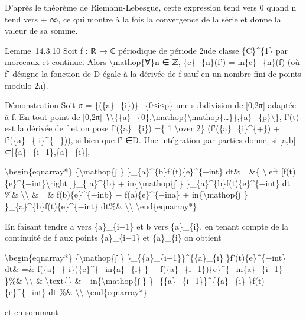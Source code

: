 \documentclass[]{article}
\begin{document}
D'après le théorème de Riemann-Lebesgue, cette expression tend vers 0
quand n tend vers + ∞, ce qui montre à la fois la convergence de la
série et donne la valeur de sa somme.

Lemme~14.3.10 Soit f : ℝ → ℂ périodique de période 2πde classe
\{C\}\^{}\{1\} par morceaux et continue. Alors
\textbackslash{}mathop\{∀\}n ∈ ℤ, \{c\}\_\{n\}(f') = in\{c\}\_\{n\}(f)
(où f' désigne la fonction de D égale à la dérivée de f sauf en un
nombre fini de points modulo 2π).

Démonstration Soit σ = \{(\{a\}\_\{i\})\}\_\{0≤i≤p\} une subdivision de
{[}0,2π{]} adaptée à f. En tout point de {[}0,2π{]}
∖\textbackslash{}\{\{a\}\_\{0\},\textbackslash{}mathop\{\textbackslash{}mathop\{\ldots{}\}\},\{a\}\_\{p\}\textbackslash{}\},
f'(t) est la dérivée de f et on pose f'(\{a\}\_\{i\}) =\{ 1
\textbackslash{}over 2\} (f'(\{a\}\_\{i\}\^{}\{+\}) + f'(\{a\}\_\{
i\}\^{}\{−\})), si bien que f' ∈D. Une intégration par parties donne, si
{[}a,b{]} ⊂{]}\{a\}\_\{i−1\},\{a\}\_\{i\}{[},

\textbackslash{}begin\{eqnarray*\} \{\textbackslash{}mathop\{∫ \}
\}\_\{a\}\^{}\{b\}f'(t)\{e\}\^{}\{−int\} dt\& =\&\{ \textbackslash{}left
{[}f(t)\{e\}\^{}\{−int\}\textbackslash{}right {]}\}\_\{ a\}\^{}\{b\} +
in\{\textbackslash{}mathop\{∫ \} \}\_\{a\}\^{}\{b\}f(t)\{e\}\^{}\{−int\}
dt \%\& \textbackslash{}\textbackslash{} \& =\& f(b)\{e\}\^{}\{−inb\} −
f(a)\{e\}\^{}\{−ina\} + in\{\textbackslash{}mathop\{∫ \}
\}\_\{a\}\^{}\{b\}f(t)\{e\}\^{}\{−int\} dt\%\&
\textbackslash{}\textbackslash{} \textbackslash{}end\{eqnarray*\}

En faisant tendre a vers \{a\}\_\{i−1\} et b vers \{a\}\_\{i\}, en
tenant compte de la continuité de f aux points \{a\}\_\{i−1\} et
\{a\}\_\{i\} on obtient

\textbackslash{}begin\{eqnarray*\} \{\textbackslash{}mathop\{∫ \}
\}\_\{\{a\}\_\{i−1\}\}\^{}\{\{a\}\_\{i\} \}f'(t)\{e\}\^{}\{−int\} dt\&
=\& f(\{a\}\_\{ i\})\{e\}\^{}\{−in\{a\}\_\{i\} \} −
f(\{a\}\_\{i−1\})\{e\}\^{}\{−in\{a\}\_\{i−1\} \}\%\&
\textbackslash{}\textbackslash{} \& \textbackslash{}text\{\} \&
+in\{\textbackslash{}mathop\{∫ \}
\}\_\{\{a\}\_\{i−1\}\}\^{}\{\{a\}\_\{i\} \}f(t)\{e\}\^{}\{−int\} dt \%\&
\textbackslash{}\textbackslash{} \textbackslash{}end\{eqnarray*\}

et en sommant
\end{document}
